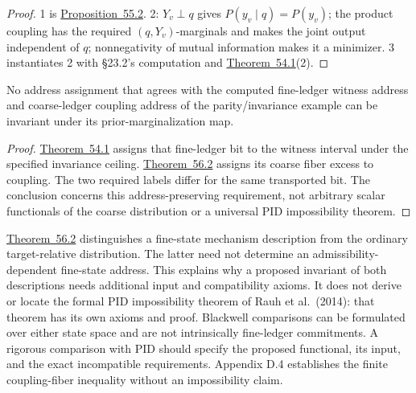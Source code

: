 \begin{proof}

1 is \hyperlink{stmt:55.2}{Proposition~55.2}. 2: \(Y_v \perp q\) gives \(P(y_v \mid q) = P(y_v)\); the product coupling has the required \((q, Y_v)\)-marginals and makes the joint output independent of \(q\); nonnegativity of mutual information makes it a minimizer. 3 instantiates 2 with §23.2's computation and \hyperlink{stmt:54.1}{Theorem~54.1}(2).
\end{proof}

\begin{thmplain}

No address assignment that agrees with the computed fine-ledger witness address and coarse-ledger coupling address of the parity/invariance example can be invariant under its prior-marginalization map.
\end{thmplain}

\begin{proof}

\hyperlink{stmt:54.1}{Theorem~54.1} assigns that fine-ledger bit to the witness interval under the specified invariance ceiling. \hyperlink{stmt:56.2}{Theorem~56.2} assigns its coarse fiber excess to coupling. The two required labels differ for the same transported bit. The conclusion concerns this address-preserving requirement, not arbitrary scalar functionals of the coarse distribution or a universal PID impossibility theorem.
\end{proof}

\begin{thmrem}

\hyperlink{stmt:56.2}{Theorem~56.2} distinguishes a fine-state mechanism description from the ordinary target-relative distribution. The latter need not determine an admissibility-dependent fine-state address. This explains why a proposed invariant of both descriptions needs additional input and compatibility axioms. It does not derive or locate the formal PID impossibility theorem of Rauh et al.~(2014): that theorem has its own axioms and proof. Blackwell comparisons can be formulated over either state space and are not intrinsically fine-ledger commitments. A rigorous comparison with PID should specify the proposed functional, its input, and the exact incompatible requirements. Appendix D.4 establishes the finite coupling-fiber inequality without an impossibility claim.
\end{thmrem}

